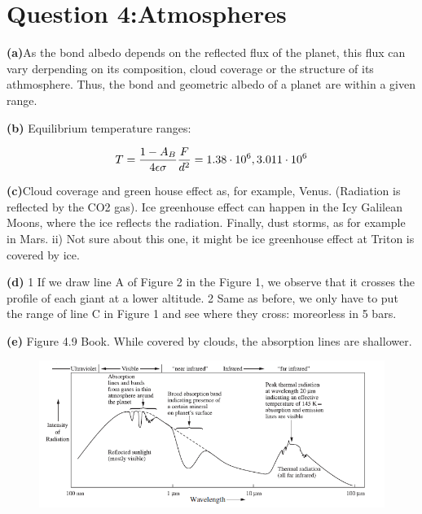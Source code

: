 
\section{ Question 4:Atmospheres }\label{sec:q4}    


\textbf{(a)}As the bond albedo depends on the reflected flux of the planet, this flux can vary derpending on its composition, cloud coverage or the structure of its athmosphere. Thus, the bond and geometric albedo of a planet are within a given range.

\textbf{(b)} Equilibrium temperature ranges: 

\begin{equation}
T = \frac{1-A_B}{4\epsilon\sigma}\frac{F}{d^2} = 1.38\cdot10^{6}, 3.011\cdot10^{6}
\end{equation}


\textbf{(c)}Cloud coverage and green house effect as, for example, Venus. (Radiation is reflected by the CO2 gas). Ice greenhouse effect can happen in the Icy Galilean Moons, where the ice reflects the radiation. Finally, dust storms, as for example in Mars. ii) Not sure about this one, it might be ice greenhouse effect at Triton is covered by ice.


\textbf{(d)} 1 If we draw line A of Figure 2 in the Figure 1, we observe that it crosses the profile of each giant at a lower altitude. 2 Same as before, we only have to put the range of line C in Figure 1 and see where they cross: moreorless in 5 bars.

\textbf{(e)} Figure 4.9 Book. While covered by clouds, the absorption lines are shallower.

\begin{figure}
	\centering
	\includegraphics[width=0.7\linewidth]{pics/Q4}
	\caption{}
	\label{fig:q4}
\end{figure}
